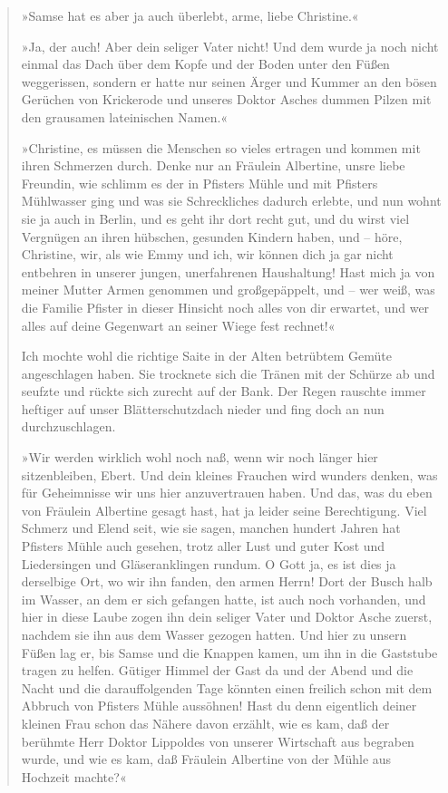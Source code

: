 \begin{verse}
»Samse hat es aber ja auch überlebt, arme, liebe Christine.«

»Ja, der auch! Aber dein seliger Vater nicht! Und dem wurde ja noch
nicht einmal das Dach über dem Kopfe und der Boden unter den Füßen
weggerissen, sondern er hatte nur seinen Ärger und Kummer an den
bösen Gerüchen von Krickerode und unseres Doktor Asches dummen
Pilzen mit den grausamen lateinischen Namen.«

»Christine, es müssen die Menschen so vieles ertragen und kommen
mit ihren Schmerzen durch. Denke nur an Fräulein Albertine, unsre
liebe Freundin, wie schlimm es der in Pfisters Mühle und mit
Pfisters Mühlwasser ging und was sie Schreckliches dadurch erlebte,
und nun wohnt sie ja auch in Berlin, und es geht ihr dort recht
gut, und du wirst viel Vergnügen an ihren hübschen, gesunden
Kindern haben, und – höre, Christine, wir, als wie Emmy und ich,
wir können dich ja gar nicht entbehren in unserer jungen,
unerfahrenen Haushaltung! Hast mich ja von meiner Mutter Armen
genommen und großgepäppelt, und – wer weiß, was die Familie Pfister
in dieser Hinsicht noch alles von dir erwartet, und wer alles auf
deine Gegenwart an seiner Wiege fest rechnet!«

Ich mochte wohl die richtige Saite in der Alten betrübtem Gemüte
angeschlagen haben. Sie trocknete sich die Tränen mit der Schürze
ab und seufzte und rückte sich zurecht auf der Bank. Der Regen
rauschte immer heftiger auf unser Blätterschutzdach nieder und fing
doch an nun durchzuschlagen.

»Wir werden wirklich wohl noch naß, wenn wir noch länger hier
sitzenbleiben, Ebert. Und dein kleines Frauchen wird wunders
denken, was für Geheimnisse wir uns hier anzuvertrauen haben. Und
das, was du eben von Fräulein Albertine gesagt hast, hat ja leider
seine Berechtigung. Viel Schmerz und Elend seit, wie sie sagen,
manchen hundert Jahren hat Pfisters Mühle auch gesehen, trotz aller
Lust und guter Kost und Liedersingen und Gläseranklingen rundum. O
Gott ja, es ist dies ja derselbige Ort, wo wir ihn fanden, den
armen Herrn! Dort der Busch halb im Wasser, an dem er sich gefangen
hatte, ist auch noch vorhanden, und hier in diese Laube zogen ihn
dein seliger Vater und Doktor Asche zuerst, nachdem sie ihn aus dem
Wasser gezogen hatten. Und hier zu unsern Füßen lag er, bis Samse
und die Knappen kamen, um ihn in die Gaststube tragen zu helfen.
Gütiger Himmel der Gast da und der Abend und die Nacht und die
darauffolgenden Tage könnten einen freilich schon mit dem Abbruch
von Pfisters Mühle aussöhnen! Hast du denn eigentlich deiner
kleinen Frau schon das Nähere davon erzählt, wie es kam, daß der
berühmte Herr Doktor Lippoldes von unserer Wirtschaft aus begraben
wurde, und wie es kam, daß Fräulein Albertine von der Mühle aus
Hochzeit machte?«


\end{verse}
